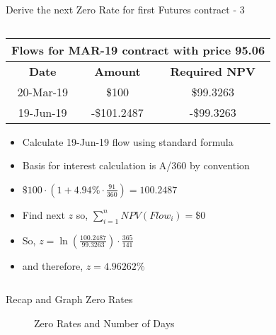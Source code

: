 \documentclass[handout, aspectratio=169]{beamer}
\begin{document}
\begin{frame}{Derive the next Zero Rate for first Futures contract - 3}
\begin{columns}[T]
		\begin{column}{0.7\textwidth}
			\begin{table}[t]
				\centering
				\begin{adjustbox}{max width=0.6\textwidth}
					\begin{tabular}{|c|c|c|} 
						\hline
						\multicolumn{3}{|c|}{\textbf{Flows for MAR-19 contract with price 95.06}} \\
						\hline
						\textbf{Date} & \textbf{Amount}  & \textbf{Required NPV}\\				
						\hline
						20-Mar-19 & \$100 & \$99.3263 \\
						\hline
						19-Jun-19 & -\$101.2487 & -\$99.3263 \\
						\hline
					\end{tabular}
				\end{adjustbox}
			\end{table}
			\begin{itemize}
				\footnotesize
				\item Calculate 19-Jun-19 flow using standard formula
				\item Basis for interest calculation is A/360 by convention 
				\item $\$100 \cdot (1+4.94\% \cdot \frac{91}{360}) = 100.2487$
				\item Find next $z$ so, $\sum_{i=1}^{n} NPV(Flow_i) = \$0$
				\item So, $z = \ln(\frac{100.2487}{99.3263}) \cdot \frac{365}{141}$
				\item and therefore, $z = 4.96262\%$
			\end{itemize}
		 \end{column}
	\end{columns}
\end{frame}

\begin{frame}{Recap and Graph Zero Rates}
	\begin{figure}
		\caption{Zero Rates and Number of Days}
	\end{figure}
\end{frame}
\end{document}
